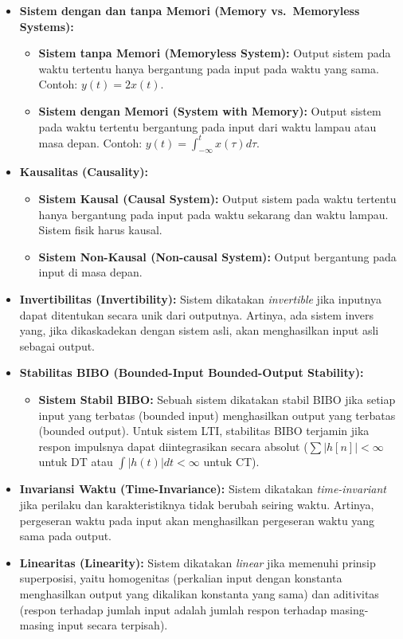 \documentclass[
  letterpaper,
  DIV=11,
  numbers=noendperiod]{scrreprt}
\providecommand{\tightlist}{%
  \setlength{\itemsep}{0pt}\setlength{\parskip}{0pt}}
\begin{document}
\begin{itemize}
\tightlist
\item
  \textbf{Sistem dengan dan tanpa Memori (Memory vs.~Memoryless
  Systems):}

  \begin{itemize}
  \tightlist
  \item
    \textbf{Sistem tanpa Memori (Memoryless System):} Output sistem pada
    waktu tertentu hanya bergantung pada input pada waktu yang sama.
    Contoh: \(y(t) = 2x(t)\).
  \item
    \textbf{Sistem dengan Memori (System with Memory):} Output sistem
    pada waktu tertentu bergantung pada input dari waktu lampau atau
    masa depan. Contoh: \(y(t) = \int_{-\infty}^{t} x(\tau)d\tau\).
  \end{itemize}
\item
  \textbf{Kausalitas (Causality):}

  \begin{itemize}
  \tightlist
  \item
    \textbf{Sistem Kausal (Causal System):} Output sistem pada waktu
    tertentu hanya bergantung pada input pada waktu sekarang dan waktu
    lampau. Sistem fisik harus kausal.
  \item
    \textbf{Sistem Non-Kausal (Non-causal System):} Output bergantung
    pada input di masa depan.
  \end{itemize}
\item
  \textbf{Invertibilitas (Invertibility):} Sistem dikatakan
  \emph{invertible} jika inputnya dapat ditentukan secara unik dari
  outputnya. Artinya, ada sistem invers yang, jika dikaskadekan dengan
  sistem asli, akan menghasilkan input asli sebagai output.
\item
  \textbf{Stabilitas BIBO (Bounded-Input Bounded-Output Stability):}

  \begin{itemize}
  \tightlist
  \item
    \textbf{Sistem Stabil BIBO:} Sebuah sistem dikatakan stabil BIBO
    jika setiap input yang terbatas (bounded input) menghasilkan output
    yang terbatas (bounded output). Untuk sistem LTI, stabilitas BIBO
    terjamin jika respon impulsnya dapat diintegrasikan secara absolut
    (\(\sum |h[n]| < \infty\) untuk DT atau \(\int |h(t)| dt < \infty\)
    untuk CT).
  \end{itemize}
\item
  \textbf{Invariansi Waktu (Time-Invariance):} Sistem dikatakan
  \emph{time-invariant} jika perilaku dan karakteristiknya tidak berubah
  seiring waktu. Artinya, pergeseran waktu pada input akan menghasilkan
  pergeseran waktu yang sama pada output.
\item
  \textbf{Linearitas (Linearity):} Sistem dikatakan \emph{linear} jika
  memenuhi prinsip superposisi, yaitu homogenitas (perkalian input
  dengan konstanta menghasilkan output yang dikalikan konstanta yang
  sama) dan aditivitas (respon terhadap jumlah input adalah jumlah
  respon terhadap masing-masing input secara terpisah).
\end{itemize}
\end{document}
